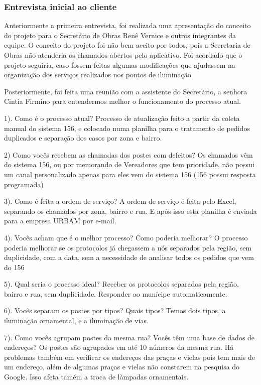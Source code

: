 \documentclass[
	article,			%
	11pt,				%
	oneside,			%
	a4paper,			%
	english,			%
	brazil,				%
	sumario=tradicional
	]{abntex2}
\begin{document}
\subsubsection{Entrevista inicial ao cliente}

Anteriormente a primeira entrevista, foi realizada uma apresentação do conceito
do projeto para o Secretário de Obras Renê Vernice e outros integrantes da
equipe. O conceito do projeto foi não bem aceito por todos, pois a Secretaria
de Obras não atenderia os chamados abertos pelo aplicativo. Foi acordado que o
projeto seguiria, caso fossem feitas algumas modificações que ajudassem na
organização dos serviços realizados nos pontos de iluminação.

Posteriormente, foi feita uma reunião com a assistente do Secretário, a senhora
Cintia Firmino para entendermos melhor o funcionamento do processo atual.

1). Como é o processo atual?
Processo de atualização feito a partir da coleta manual do sistema 156, e
colocado numa planilha para o tratamento de pedidos duplicados e separação
dos casos por zona e bairro.

2) Como vocês recebem as chamadas dos postes com defeitos?
Os chamados vêm do sistema 156, ou por memorando de Vereadores que tem
prioridade, não possui um canal personalizado apenas para eles vem do
sistema 156 (156 possui resposta programada)

3). Como é feita a ordem de serviço?
A ordem de serviço é feita pelo Excel, separando os chamados por zona,
bairro e rua. E após isso esta planilha é enviada para a empresa URBAM por
e-mail.

4). Vocês acham que é o melhor processo? Como poderia melhorar?
O processo poderia melhorar se os protocolos já chegassem a nós separados pela
região, sem duplicidade, com a data, sem a necessidade de analisar todos os
pedidos que vem do 156

5). Qual seria o processo ideal?
Receber os protocolos separados pela região, bairro e rua, sem duplicidade.
Responder ao munícipe automaticamente.

6). Vocês separam os postes por tipos? Quais tipos?
Temos dois tipos, a iluminação ornamental, e a iluminação de vias.

7). Como vocês agrupam postes da mesma rua? Vocês têm uma base de dados de
endereços?
Os postes são agrupados em até 10 números da mesma rua. Há problemas
também em verificar os endereços das praças e vielas pois tem mais de um
endereço, além de algumas praças e vielas não constarem na pesquisa do Google.
Isso afeta tamém a troca de làmpadas ornamentais.
\end{document}

